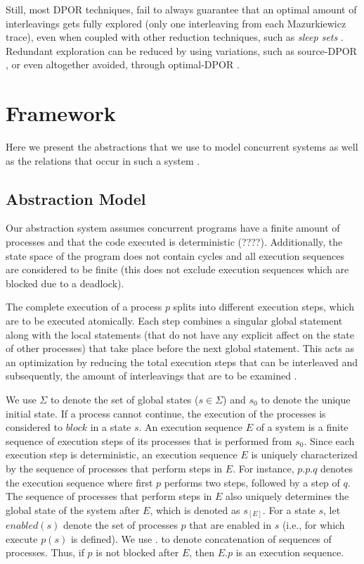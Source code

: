 Still, most DPOR techniques, fail to always guarantee that an optimal amount of interleavings gets fully explored (only one 
interleaving from each Mazurkiewicz trace), 
even when coupled with other reduction techniques, such as \textit{sleep sets} \cite{Godefroid1996}. Redundant exploration
can be reduced by using variations, such as source-DPOR \cite{AbdullaAronisJohnssonSagonasDPOR2014}, or even altogether avoided, through optimal-DPOR 
\cite{AbdullaAronisJohnssonSagonasDPOR2014}.

\section{Framework}

Here we present the abstractions that we use to model concurrent systems as well as the relations that
occur in such a system \cite{AbdullaAronisJohnssonSagonasDPOR2014}.

\subsection{Abstraction Model}

Our abstraction system assumes concurrent programs have a finite amount of processes and that
the code executed is deterministic (????). Additionally, the state space of the program does not
contain cycles and all execution sequences are considered to be finite (this does not exclude
execution sequences which are blocked due to a deadlock).

The complete execution of a process $p$ splits into different execution steps, which are to be 
executed atomically. Each step combines a singular global statement along with the local statements
(that do not have any explicit affect on the state of other processes) that take place before the next
global statement. This acts as an optimization by reducing the total execution steps that can be
interleaved and subsequently, the amount of interleavings that are to be examined \cite{Godefroid:1997:MCP:263699.263717}. 

We use $\Sigma$ to denote the set of global states ($s\in\Sigma$) and $s_0$ to 
denote the unique initial state. If a process cannot continue, the execution 
of the processes is considered to $block$ in a state $s$.
An execution sequence $E$ of a system is a finite sequence of
execution steps of its processes that is performed from $s_0$. Since each execution step is 
deterministic, an execution sequence $E$ is uniquely characterized by the sequence of processes
that perform steps in $E$. For instance, $p.p.q$ denotes the execution
sequence where first $p$ performs two steps, followed by a step of $q$.
The sequence of processes that perform steps in $E$ also uniquely
determines the global state of the system after $E$, which is denoted as
$s_{[E]}$. For a state $s$, let $enabled(s)$ denote the set of processes $p$ that
are enabled in $s$ (i.e., for which execute $p(s)$ is defined). We use $.$ to
denote concatenation of sequences of processes. Thus, if $p$ is not
blocked after $E$, then $E.p$ is an execution sequence.

